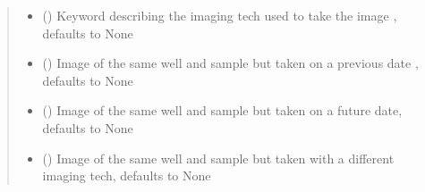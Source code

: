 \documentclass[letterpaper,10pt,english]{sphinxmanual}
\begin{document}
\begin{fulllineitems}
\begin{quote}
\begin{description}
\begin{itemize}
\item {} 
 (\sphinxstyleliteralemphasis{\sphinxupquote{, }}) \textendash{} Keyword describing the imaging tech used to take the image
, defaults to None

\item {} 
 ({\hyperref[\detokenize{polo.crystallography:polo.crystallography.image.Image}]{}}\sphinxstyleliteralemphasis{\sphinxupquote{, }}) \textendash{} Image of the same well and sample but taken on a previous date
, defaults to None

\item {} 
 ({\hyperref[\detokenize{polo.crystallography:polo.crystallography.image.Image}]{}}\sphinxstyleliteralemphasis{\sphinxupquote{, }}) \textendash{} Image of the same well and sample but taken on a future 
date, defaults to None

\item {} 
 ({\hyperref[\detokenize{polo.crystallography:polo.crystallography.image.Image}]{}}\sphinxstyleliteralemphasis{\sphinxupquote{, }}) \textendash{} Image of the same well and sample but taken with a 
different imaging tech, defaults to None

\end{itemize}

\end{description}\end{quote}

\begin{fulllineitems}
\label{\detokenize{polo.crystallography:polo.crystallography.image.Image.bites}}
\end{fulllineitems}


\end{fulllineitems}
\end{document}
